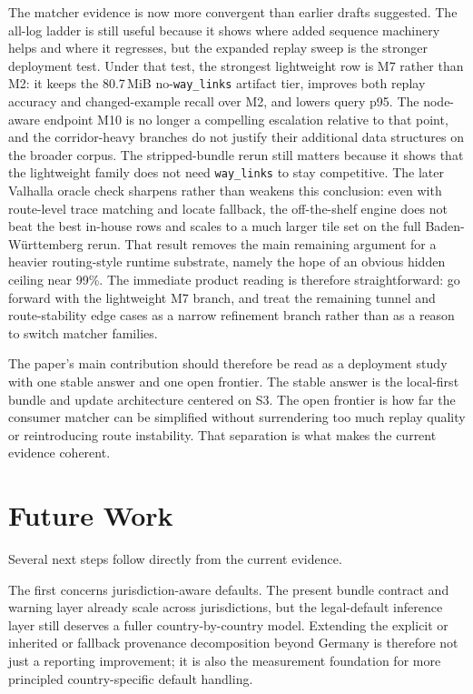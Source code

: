 \documentclass{article}
\begin{document}
The matcher evidence is now more convergent than earlier drafts suggested. The all-log ladder is still useful because it shows where added sequence machinery helps and where it regresses, but the expanded replay sweep is the stronger deployment test. Under that test, the strongest lightweight row is M7 rather than M2: it keeps the 80.7\,MiB no-\texttt{way\_links} artifact tier, improves both replay accuracy and changed-example recall over M2, and lowers query p95. The node-aware endpoint M10 is no longer a compelling escalation relative to that point, and the corridor-heavy branches do not justify their additional data structures on the broader corpus. The stripped-bundle rerun still matters because it shows that the lightweight family does not need \texttt{way\_links} to stay competitive. The later Valhalla oracle check sharpens rather than weakens this conclusion: even with route-level trace matching and locate fallback, the off-the-shelf engine does not beat the best in-house rows and scales to a much larger tile set on the full Baden-W\"urttemberg rerun. That result removes the main remaining argument for a heavier routing-style runtime substrate, namely the hope of an obvious hidden ceiling near 99\%. The immediate product reading is therefore straightforward: go forward with the lightweight M7 branch, and treat the remaining tunnel and route-stability edge cases as a narrow refinement branch rather than as a reason to switch matcher families.

The paper's main contribution should therefore be read as a deployment study with one stable answer and one open frontier. The stable answer is the local-first bundle and update architecture centered on S3. The open frontier is how far the consumer matcher can be simplified without surrendering too much replay quality or reintroducing route instability. That separation is what makes the current evidence coherent.

\section{Future Work}
Several next steps follow directly from the current evidence.

The first concerns jurisdiction-aware defaults. The present bundle contract and warning layer already scale across jurisdictions, but the legal-default inference layer still deserves a fuller country-by-country model. Extending the explicit or inherited or fallback provenance decomposition beyond Germany is therefore not just a reporting improvement; it is also the measurement foundation for more principled country-specific default handling.
\end{document}
